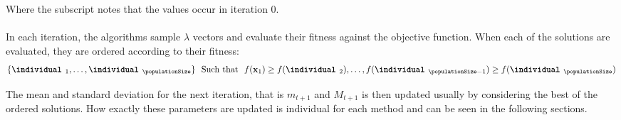 Where the subscript notes that the values occur in iteration 0.\\
\\
In each iteration, the algorithms sample $\lambda$ vectors and evaluate their fitness
against the objective function. When each of the solutions are evaluated,
they are ordered according to their fitness:
\begin{align*}
\{\textbf{\individual }_{1}, \hdots, \textbf{\individual }_{\populationSize }\}\ \ \text{Such that}\ \ 
f(\textbf{x}_1) \geq f(\textbf{\individual }_2), \hdots, f(\textbf{\individual }_{\populationSize  - 1}) \geq f(\textbf{\individual }_{\populationSize })
\end{align*}

The mean and standard deviation for the next iteration, that is $m_{t+1}$ and $M_{t+1}$
is then updated usually by considering the best of the ordered solutions. How exactly
these parameters are updated is individual for each method and can be seen in the following
sections.


